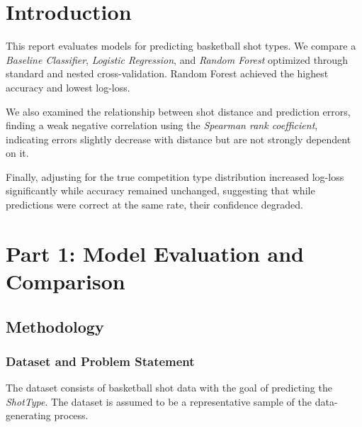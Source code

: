\documentclass[fleqn,moreauthors,10pt]{ds_report}
\begin{document}
%
\raggedbottom

\maketitle

\thispagestyle{empty} 


\section*{Introduction}

This report evaluates models for predicting basketball shot types. We compare a \textit{Baseline Classifier}, \textit{Logistic Regression}, and \textit{Random Forest} optimized through standard and nested cross-validation. Random Forest achieved the highest accuracy and lowest log-loss.

We also examined the relationship between shot distance and prediction errors, finding a weak negative correlation using the \textit{Spearman rank coefficient}, indicating errors slightly decrease with distance but are not strongly dependent on it.

Finally, adjusting for the true competition type distribution increased log-loss significantly while accuracy remained unchanged, suggesting that while predictions were correct at the same rate, their confidence degraded.

\section*{Part 1: Model Evaluation and Comparison}

\subsection*{Methodology}

\subsubsection*{Dataset and Problem Statement}
The dataset consists of basketball shot data with the goal of predicting the \textit{ShotType}. The dataset is assumed to be a representative sample of the data-generating process.
\end{document}
